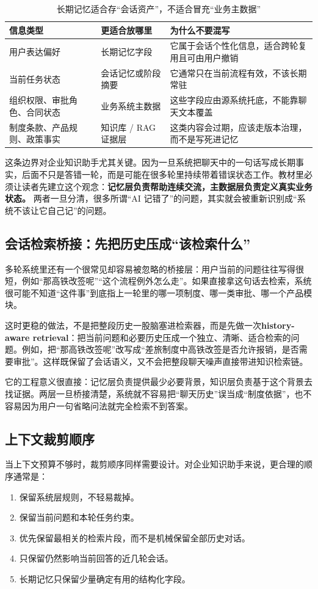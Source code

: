 \begin{table}[H]
\centering
\small
\begin{tabularx}{\textwidth}{>{\raggedright\arraybackslash}p{3cm}>{\raggedright\arraybackslash}p{3cm}>{\raggedright\arraybackslash}X}
\toprule
\textbf{信息类型} & \textbf{更适合放哪里} & \textbf{为什么不要混写} \\
\midrule
用户表达偏好 & 长期记忆字段 & 它属于会话个性化信息，适合跨轮复用且可由用户撤销 \\
当前任务状态 & 会话记忆或阶段摘要 & 它通常只在当前流程有效，不该长期常驻 \\
组织权限、审批角色、合同状态 & 业务系统主数据 & 这些字段应由源系统托底，不能靠聊天文本覆盖 \\
制度条款、产品规则、政策事实 & 知识库 / RAG 证据层 & 这类内容会过期，应该走版本治理，而不是写死进记忆 \\
\bottomrule
\end{tabularx}
\caption{长期记忆适合存“会话资产”，不适合冒充“业务主数据”}
\label{tab:memory-vs-master-data}
\end{table}

这条边界对企业知识助手尤其关键。因为一旦系统把聊天中的一句话写成长期事实，后面不只是答错一轮，而是可能在很多轮里持续带着错误状态工作。教材里必须让读者先建立这个观念：\textbf{记忆层负责帮助连续交流，主数据层负责定义真实业务状态。} 两者一旦分清，很多所谓“AI 记错了”的问题，其实就会被重新识别成“系统不该让它自己记”的问题。

\subsection{会话检索桥接：先把历史压成“该检索什么”}
多轮系统里还有一个很常见却容易被忽略的桥接层：用户当前的问题往往写得很短，例如“那高铁改签呢”“这个流程例外怎么走”。如果直接拿这句话去检索，系统很可能不知道“这件事”到底指上一轮里的哪一项制度、哪一类审批、哪一个产品模块。

这时更稳的做法，不是把整段历史一股脑塞进检索器，而是先做一次\textbf{history-aware retrieval}：把当前问题和必要历史压成一个独立、清晰、适合检索的问题。例如，把“那高铁改签呢”改写成“差旅制度中高铁改签是否允许报销，是否需要审批”。这样既保留了会话语义，又不会把整段聊天噪声直接带进知识检索链。

它的工程意义很直接：记忆层负责提供最少必要背景，知识层负责基于这个背景去找证据。两层一旦桥接清楚，系统就不容易把“聊天历史”误当成“制度依据”，也不容易因为用户一句省略问法就完全检索不到答案。

\subsection{上下文裁剪顺序}
当上下文预算不够时，裁剪顺序同样需要设计。对企业知识助手来说，更合理的顺序通常是：
\begin{enumerate}
  \item 保留系统层规则，不轻易裁掉。
  \item 保留当前问题和本轮任务约束。
  \item 优先保留最相关的检索片段，而不是机械保留全部历史对话。
  \item 只保留仍然影响当前回答的近几轮会话。
  \item 长期记忆只保留少量确定有用的结构化字段。
\end{enumerate}


